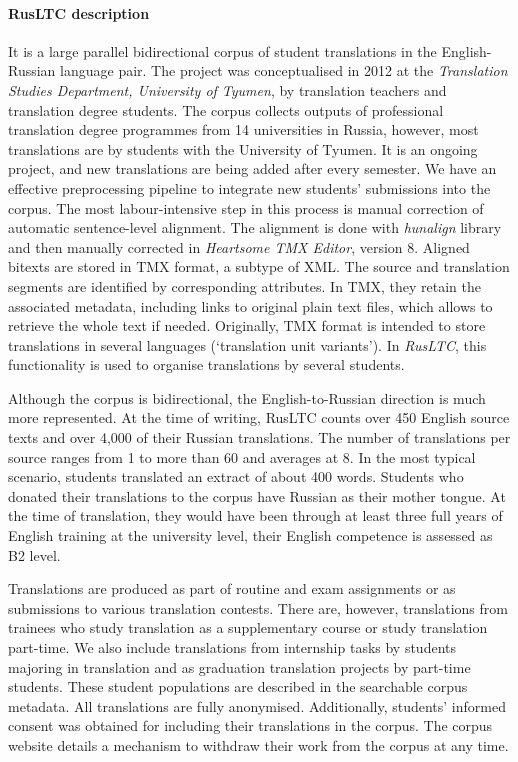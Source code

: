 \paragraph{RusLTC description} It is a large parallel bidirectional corpus of student translations in the English-Russian language pair. The project was conceptualised in 2012 at the \textit{Translation Studies Department, University of Tyumen}, by translation teachers and translation degree students. The corpus collects outputs of professional translation degree programmes from 14 universities in Russia, however, most translations are by students with the University of Tyumen. It is an ongoing project, and new translations are being added after every semester. We have an effective preprocessing pipeline to integrate new students' submissions into the corpus. The most labour-intensive step in this process is manual correction of automatic sentence-level alignment. The alignment is done with \textit{hunalign} library~\cite{Varga2007} and then manually corrected in \textit{Heartsome TMX Editor}, version 8. Aligned bitexts are stored in \gls{TMX} format, a subtype of \gls{XML}. The source and translation segments are identified by corresponding  attributes. In TMX, they retain the associated metadata, including links to original plain text files, which allows to retrieve the whole text if needed. Originally, TMX format is intended to store translations in several languages (`translation unit variants'). In \textit{RusLTC}, this functionality is used to organise translations by several students.

Although the corpus is bidirectional, the English-to-Russian direction is much more represented. At the time of writing, RusLTC counts over 450 English source texts and over 4,000 of their Russian translations. The number of translations per source ranges from 1 to more than 60 and averages at 8. In the most typical scenario, students translated an extract of about 400 words. Students who donated their translations to the corpus have Russian as their mother tongue. At the time of translation, they would have been through at least three full years of English training at the university level, their English competence is assessed as B2 level.

Translations are produced as part of routine and exam assignments or as submissions to various translation contests. There are, however, translations from trainees who study translation as a supplementary course or study translation part-time. We also include translations from internship tasks by students majoring in translation and as graduation translation projects by part-time students. These student populations are described in the searchable corpus metadata. 
All translations are fully anonymised. Additionally, students' informed consent was obtained for including their translations in the corpus. The corpus website details a mechanism to withdraw their work from the corpus at any time.

